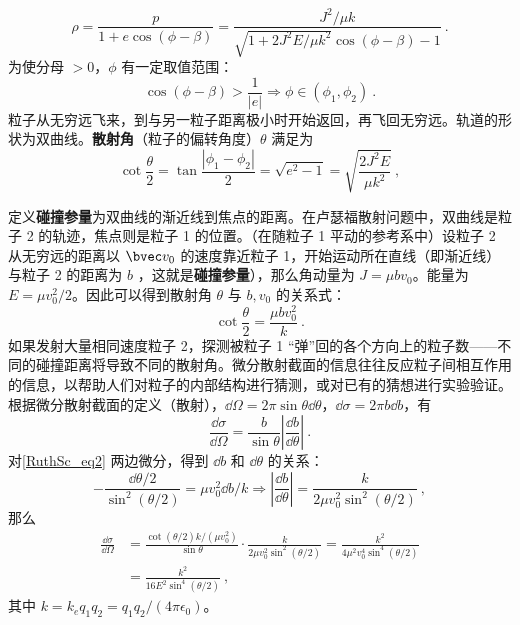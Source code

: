 \begin{equation}
\rho=\frac{p}{1+e\cos(\phi-\beta)}=\frac{J^2/\mu k}{\sqrt{1+2J^2E/\mu k^2}\cos(\phi-\beta)-1}~.
\end{equation}
为使分母 $>0$，$\phi$ 有一定取值范围：
\begin{equation}
\cos(\phi-\beta)>\frac{1}{|e|}
\Rightarrow \phi \in (\phi_1,\phi_2)~.
\end{equation}
粒子从无穷远飞来，到与另一粒子距离极小时开始返回，再飞回无穷远。轨道的形状为双曲线。\textbf{散射角}（粒子的偏转角度）$\theta$ 满足为
\begin{equation}
\cot\frac{\theta}{2}=\tan\frac{|\phi_1-\phi_2|}{2} =\sqrt{e^2-1}=\sqrt{\frac{2J^2E}{\mu k^2}}~,
\end{equation}

定义\textbf{碰撞参量}为双曲线的渐近线到焦点的距离。在卢瑟福散射问题中，双曲线是粒子 2 的轨迹，焦点则是粒子 1 的位置。（在随粒子 1 平动的参考系中）设粒子 2 从无穷远的距离以 $\bvec v_0$ 的速度靠近粒子 1，开始运动所在直线（即渐近线）与粒子 2 的距离为 $b$ ，这就是\textbf{碰撞参量}），那么角动量为 $J=\mu bv_0$。能量为 $E=\mu v_0^2/2$。因此可以得到散射角 $\theta$ 与 $b,v_0$ 的关系式：
\begin{equation}\label{RuthSc_eq2}
\cot \frac{\theta}{2}=\frac{\mu bv_0^2}{k}~.
\end{equation}
如果发射大量相同速度粒子 2，探测被粒子 1 “弹”回的各个方向上的粒子数——不同的碰撞距离将导致不同的散射角。微分散射截面的信息往往反应粒子间相互作用的信息，以帮助人们对粒子的内部结构进行猜测，或对已有的猜想进行实验验证。根据微分散射截面的定义（散射），$\dd \Omega=2\pi \sin\theta \dd \theta$，$\dd \sigma=2\pi b\dd b$，有
\begin{equation}
\frac{\dd \sigma}{\dd \Omega}=\frac{b}{\sin \theta}\left|\frac{\dd b}{\dd \theta}\right|~.
\end{equation}
对\autoref{RuthSc_eq2} 两边微分，得到 $\dd b$ 和 $\dd \theta$ 的关系：
\begin{equation}
-\frac{\dd \theta/2}{\sin^2(\theta/2)}=\mu v_0^2\dd b/k\Rightarrow \left|\frac{\dd b}{\dd \theta}\right|=\frac{k}{2\mu v_0^2\sin^2(\theta/2)}~,
\end{equation}
那么
\begin{equation}
\begin{aligned}
\frac{\dd \sigma}{\dd \Omega}&=\frac{\cot(\theta/2)k/(\mu v_0^2)}{\sin\theta}\cdot \frac{k}{2\mu v_0^2\sin^2(\theta/2)}=\frac{k^2}{4\mu ^2v_0^4\sin^4(\theta/2)}
\\
&=\frac{k^2}{16E^2\sin^4(\theta/2)}~,
\end{aligned}
\end{equation}
其中 $k=k_eq_1q_2=q_1q_2/(4\pi\epsilon_0)$。

